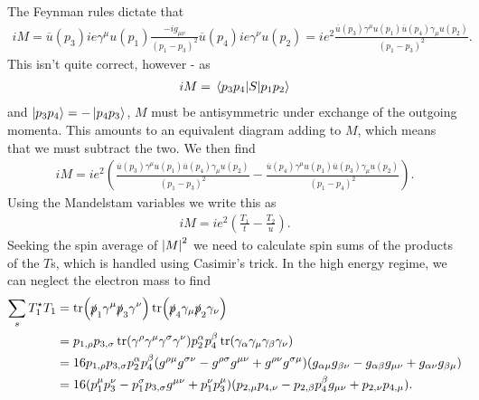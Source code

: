The Feynman rules dictate that
\begin{align*}
	iM = \overline{u}(p_{3})ie\gamma^{\mu}u(p_{1})\frac{-ig_{\mu\nu}}{(p_{1} - p_{3})^{2}}\overline{u}(p_{4})ie\gamma^{\nu}u(p_{2}) = ie^{2}\frac{\overline{u}(p_{3})\gamma^{\mu}u(p_{1})\overline{u}(p_{4})\gamma_{\mu}u(p_{2})}{(p_{1} - p_{3})^{2}}.
\end{align*}
This isn't quite correct, however - as
\begin{align*}
	iM = \mel{p_{3}p_{4}}{S}{p_{1}p_{2}}
\end{align*}
and $\ket{p_{3}p_{4}} = -\ket{p_{4}p_{3}}$, $M$ must be antisymmetric under exchange of the outgoing momenta. This amounts to an equivalent diagram adding to $M$, which means that we must subtract the two. We then find
\begin{align*}
	iM = ie^{2}\left(\frac{\overline{u}(p_{3})\gamma^{\mu}u(p_{1})\overline{u}(p_{4})\gamma_{\mu}u(p_{2})}{(p_{1} - p_{3})^{2}} - \frac{\overline{u}(p_{4})\gamma^{\mu}u(p_{1})\overline{u}(p_{3})\gamma_{\mu}u(p_{2})}{(p_{1} - p_{4})^{2}}\right).
\end{align*}
Using the Mandelstam variables we write this as
\begin{align*}
	iM = ie^{2}\left(\frac{T_{1}}{t} - \frac{T_{2}}{u}\right).
\end{align*}
Seeking the spin average of $\abs{M}^{2}$ we need to calculate spin sums of the products of the $T$s, which is handled using Casimir's trick. In the high energy regime, we can neglect the electron mass to find
\begin{align*}
	\sum\limits_{s}T_{1}^{\star} T_{1} &= \tr(\slashed{p}_{1}\gamma^{\mu}\slashed{p}_{3}\gamma^{\nu})\tr(\slashed{p}_{4}\gamma_{\mu}\slashed{p}_{2}\gamma_{\nu}) \\
	                              &= p_{1, \rho}p_{3, \sigma}\tr(\gamma^{\rho}\gamma^{\mu}\gamma^{\sigma}\gamma^{\nu})p_{2}^{\alpha}p_{4}^{\beta}\tr(\gamma_{\alpha}\gamma_{\mu}\gamma_{\beta}\gamma_{\nu}) \\
	                              &= 16p_{1, \rho}p_{3, \sigma}p_{2}^{\alpha}p_{4}^{\beta}(g^{\rho\mu}g^{\sigma\nu} - g^{\rho\sigma}g^{\mu\nu} + g^{\rho\nu}g^{\sigma\mu})(g_{\alpha\mu}g_{\beta\nu} - g_{\alpha\beta}g_{\mu\nu} + g_{\alpha\nu}g_{\beta\mu}) \\
	                              &= 16(p_{1}^{\mu}p_{3}^{\nu} - p_{1}^{\sigma}p_{3, \sigma}g^{\mu\nu} + p_{1}^{\nu}p_{3}^{\mu})(p_{2, \mu}p_{4, \nu} - p_{2, \beta}p_{4}^{\beta}g_{\mu\nu} + p_{2, \nu}p_{4, \mu}).
\end{align*}
